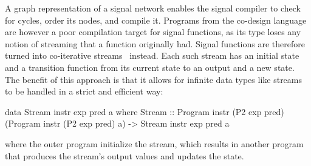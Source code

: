 \documentclass[../paper.tex]{subfiles}
\begin{document}
A graph representation of a signal network enables the signal compiler to check for cycles, order its nodes, and compile it. Programs from the co-design language are however a poor compilation target for signal functions, as its type loses any notion of streaming that a function originally had. Signal functions are therefore turned into co-iterative streams~\cite{caspi1998} instead. Each such stream has an initial state and a transition function from its current state to an output and a new state. The benefit of this approach is that it allows for infinite data types like streams to be handled in a strict and efficient way:

\begin{code}
data Stream instr exp pred a where
  Stream :: Program instr (P2 exp pred) (Program instr (P2 exp pred) a)
    -> Stream instr exp pred a
\end{code}

\noindent where the outer program initialize the stream, which results in another program that produces the stream's output values and updates the state.
\end{document}
